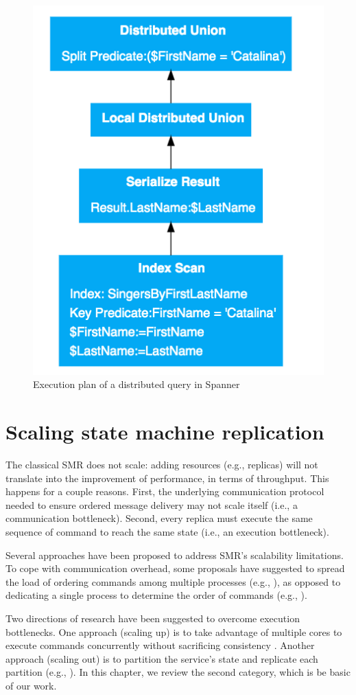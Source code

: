 \begin{figure}
  \begin{minipage}[b]{1.0\linewidth}
  \centering
        \includegraphics[width=0.6\linewidth]{figures/spanner-distributed-query}
  \end{minipage}
  \caption{Execution plan of a distributed query in Spanner}
  \label{fig:spanner-plan}
\end{figure}


\section{Scaling state machine replication}

The classical SMR does not scale: adding resources (e.g., replicas) will not
translate into the improvement of performance, in terms of throughput. This
happens for a couple reasons. First, the underlying communication protocol
needed to ensure ordered message delivery may not scale itself (i.e., a
communication bottleneck). Second, every replica must execute the same sequence
of command to reach the same state (i.e., an execution bottleneck).

Several approaches have been proposed to address SMR's scalability limitations.
To cope with communication overhead, some proposals have suggested to spread the
load of ordering commands among multiple processes (e.g.,
\cite{Moraru:2013gw,Mencius,Marandi:2012hb}), as opposed to dedicating a single
process to determine the order of commands (e.g.,
\cite{Lam98}).%

Two directions of research have been suggested to overcome execution
bottlenecks. One approach (scaling up) is to take advantage of multiple cores to
execute commands concurrently without sacrificing consistency
\cite{Kapritsos:2012um,Marandi:2014bj,Kotla:2004ep,Guo:2014jp}. Another approach
(scaling out) is to partition the service's state and replicate each partition
(e.g., \cite{Glendenning:2011kj,Marandi:2011dj}). In this chapter, we review the
second category, which is be basic of our work.

